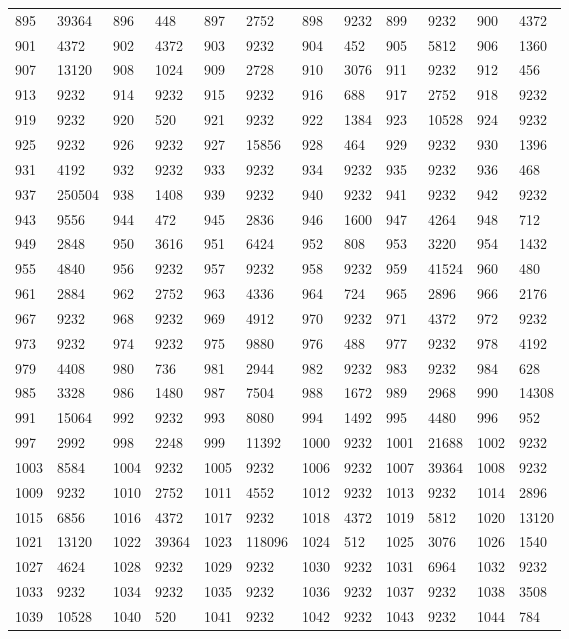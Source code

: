 \begin{longtable}{llllllllllll}
895 & 39364&896 &448&897& 2752&898 &9232&899 &9232&900& 4372\\
901 & 4372&902 &4372&903& 9232&904 &452&905 &5812&906& 1360\\
907 & 13120&908 &1024&909& 2728&910 &3076&911 &9232&912& 456\\
913 & 9232&914 &9232&915& 9232&916 &688&917 &2752&918& 9232\\
919 & 9232&920 &520&921& 9232&922 &1384&923 &10528&924& 9232\\
925 & 9232&926 &9232&927& 15856&928 &464&929 &9232&930& 1396\\
931 & 4192&932 &9232&933& 9232&934 &9232&935 &9232&936& 468\\
937 & 250504&938 &1408&939& 9232&940 &9232&941 &9232&942& 9232\\
943 & 9556&944 &472&945& 2836&946 &1600&947 &4264&948& 712\\
949 & 2848&950 &3616&951& 6424&952 &808&953 &3220&954& 1432\\
955 & 4840&956 &9232&957& 9232&958 &9232&959 &41524&960& 480\\
961 & 2884&962 &2752&963& 4336&964 &724&965 &2896&966& 2176\\
967 & 9232&968 &9232&969& 4912&970 &9232&971 &4372&972& 9232\\
973 & 9232&974 &9232&975& 9880&976 &488&977 &9232&978& 4192\\
979 & 4408&980 &736&981& 2944&982 &9232&983 &9232&984& 628\\
985 & 3328&986 &1480&987& 7504&988 &1672&989 &2968&990& 14308\\
991 & 15064&992 &9232&993& 8080&994 &1492&995 &4480&996& 952\\
997 & 2992&998 &2248&999& 11392&1000 &9232&1001 &21688&1002& 9232\\
1003 & 8584&1004 &9232&1005& 9232&1006 &9232&1007 &39364&1008& 9232\\
1009 & 9232&1010 &2752&1011& 4552&1012 &9232&1013 &9232&1014& 2896\\
1015 & 6856&1016 &4372&1017& 9232&1018 &4372&1019 &5812&1020& 13120\\
1021 & 13120&1022 &39364&1023& 118096&1024 &512&1025 &3076&1026& 1540\\
1027 & 4624&1028 &9232&1029& 9232&1030 &9232&1031 &6964&1032& 9232\\
1033 & 9232&1034 &9232&1035& 9232&1036 &9232&1037 &9232&1038& 3508\\
1039 & 10528&1040 &520&1041& 9232&1042 &9232&1043 &9232&1044& 784\\

\end{longtable}

